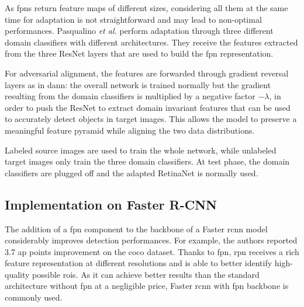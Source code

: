 \documentclass[%
    corpo=12pt,
    twoside,
    stile=classica,   
    tipotesi=magistrale,
    evenboxes,
    english,
	numerazioneromana,
]{toptesi}
\begin{document}
\bigskip
As \glspl{fpn} return feature maps of different sizes, considering all them at the same time for adaptation is not straightforward and may lead to non-optimal performances. Pasqualino \textit{et al.}\cite{pasqualino2020unsupervised} perform adaptation through three different domain classifiers with different architectures. They receive the features extracted from the three ResNet layers that are used to build the \gls{fpn} representation.

For adversarial alignment, the features are forwarded through gradient reversal layers as in \gls{dann}: the overall network is trained normally but the gradient resulting from the domain classifiers is multiplied by a negative factor $-\lambda$, in order to push the ResNet to extract domain invariant features that can be used to accurately detect objects in target images. This allows the model to preserve a meaningful feature pyramid while aligning the two data distributions.


Labeled source images are used to train the whole network, while unlabeled target images only train the three domain classifiers. At test phase, the domain classifiers are plugged off and the adapted RetinaNet is normally used.

\subsection{Implementation on Faster R-CNN}
The addition of a \gls{fpn} component to the backbone of a Faster \gls{rcnn} model considerably improves detection performances. For example, the authors reported 3.7 \gls{ap} points improvement on the \gls{coco} dataset\cite{lin2017feature}. Thanks to \gls{fpn}, \gls{rpn} receives a rich feature representation at different resolutions and is able to better identify high-quality possible \glspl{roi}. As it can achieve better results than the standard architecture without \gls{fpn} at a negligible price, Faster \gls{rcnn} with \gls{fpn} backbone is commonly used. 
\end{document}

